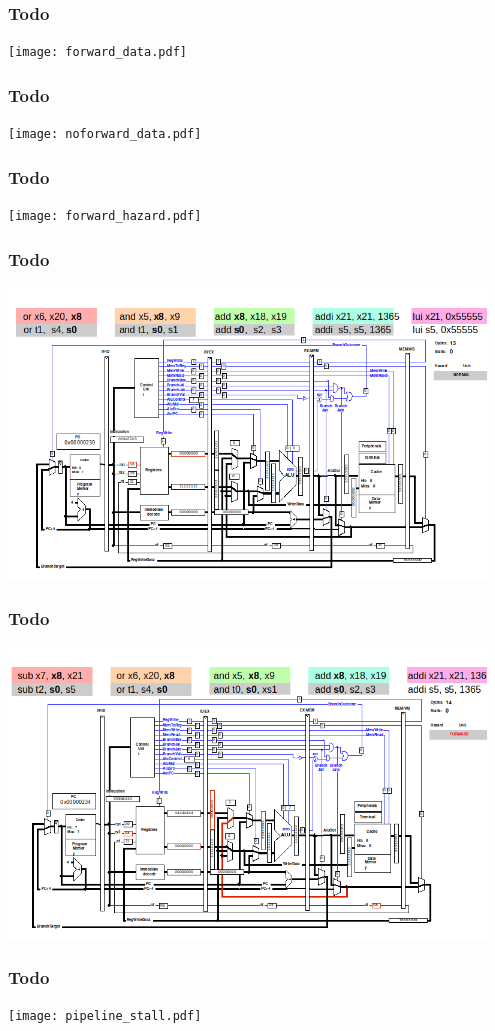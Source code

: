 \documentclass{beamer}
\begin{document}
\begin{frame}
\frametitle{Todo}
\texttt{[image: forward\_data.pdf]}
\end{frame}

\begin{frame}
\frametitle{Todo}
\texttt{[image: noforward\_data.pdf]}
\end{frame}

\begin{frame}
\frametitle{Todo}
\texttt{[image: forward\_hazard.pdf]}
\end{frame}

\begin{frame}
\frametitle{Todo}
\includegraphics[width=0.95\textwidth]{fig/hazard-forwarding.png}
\end{frame}

\begin{frame}
\frametitle{Todo}
\includegraphics[width=0.95\textwidth]{fig/hazard-forwarding2.png}
\end{frame}

\begin{frame}
\frametitle{Todo}
\texttt{[image: pipeline\_stall.pdf]}
\end{frame}
\end{document}
